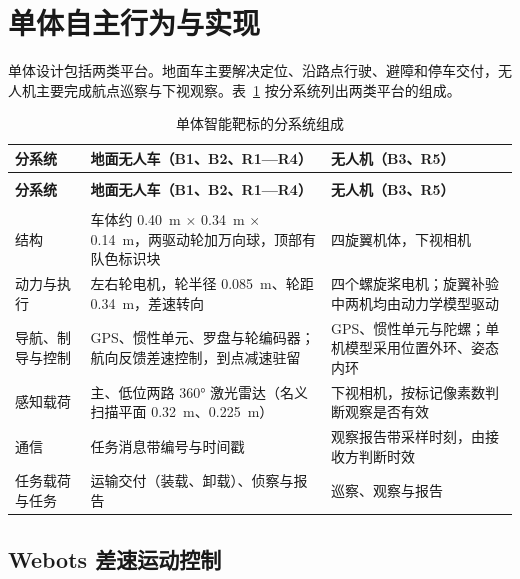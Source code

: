 \clearpage

\section{单体自主行为与实现}\label{sec:2}

单体设计包括两类平台。地面车主要解决定位、沿路点行驶、避障和停车交付，无人机主要完成航点巡察与下视观察。表~\ref{tab:7} 按分系统列出两类平台的组成。

\begingroup\small
\setlength{\tableavailable}{\dimexpr\linewidth-4\tabcolsep\relax}
\begin{longtable}{@{}>{\raggedright\arraybackslash}p{0.20000\tableavailable}>{\raggedright\arraybackslash}p{0.43000\tableavailable}>{\raggedright\arraybackslash}p{0.37000\tableavailable}@{}}
\caption{单体智能靶标的分系统组成}\label{tab:7}\\
\toprule
\textbf{分系统} & \textbf{地面无人车（B1、B2、R1—R4）} & \textbf{无人机（B3、R5）} \\
\midrule
\endfirsthead
\multicolumn{3}{@{}l}{\small\color{muted}表~\thetable\quad （续）}\\
\toprule
\textbf{分系统} & \textbf{地面无人车（B1、B2、R1—R4）} & \textbf{无人机（B3、R5）} \\
\midrule
\endhead
\midrule
\multicolumn{3}{r@{}}{\footnotesize\color{muted}续下页}\\
\endfoot
\bottomrule
\endlastfoot
结构 & 车体约 0.40~m \ensuremath{\times} 0.34~m \ensuremath{\times} 0.14~m，两驱动轮加万向球，顶部有队色标识块 & 四旋翼机体，下视相机 \\
动力与执行 & 左右轮电机，轮半径 0.085~m、轮距 0.34~m，差速转向 & 四个螺旋桨电机；旋翼补验中两机均由动力学模型驱动 \\
导航、制导与控制 & GPS、惯性单元、罗盘与轮编码器；航向反馈差速控制，到点减速驻留 & GPS、惯性单元与陀螺；单机模型采用位置外环、姿态内环 \\
感知载荷 & 主、低位两路 360° 激光雷达（名义扫描平面 0.32~m、0.225~m） & 下视相机，按标记像素数判断观察是否有效 \\
通信 & 任务消息带编号与时间戳 & 观察报告带采样时刻，由接收方判断时效 \\
任务载荷与任务 & 运输交付（装载、卸载）、侦察与报告 & 巡察、观察与报告 \\
\end{longtable}
\endgroup


\subsection{Webots 差速运动控制}\label{sec:2.1}

